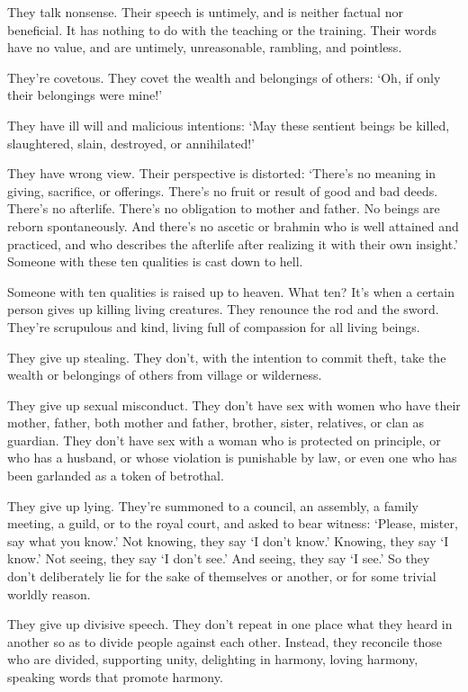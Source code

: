 \documentclass[12pt,openany]{book}%
\begin{document}
They talk nonsense. Their speech is untimely, and is neither factual nor beneficial. It has nothing to do with the teaching or the training. Their words have no value, and are untimely, unreasonable, rambling, and pointless. 

They’re covetous. They covet the wealth and belongings of others: ‘Oh, if only their belongings were mine!’ 

They have ill will and malicious intentions: ‘May these sentient beings be killed, slaughtered, slain, destroyed, or annihilated!’ 

They have wrong view. Their perspective is distorted: ‘There’s no meaning in giving, sacrifice, or offerings. There’s no fruit or result of good and bad deeds. There’s no afterlife. There’s no obligation to mother and father. No beings are reborn spontaneously. And there’s no ascetic or brahmin who is well attained and practiced, and who describes the afterlife after realizing it with their own insight.’ Someone with these ten qualities is cast down to hell. 

Someone with ten qualities is raised up to heaven. What ten? It’s when a certain person gives up killing living creatures. They renounce the rod and the sword. They’re scrupulous and kind, living full of compassion for all living beings. 

They give up stealing. They don’t, with the intention to commit theft, take the wealth or belongings of others from village or wilderness. 

They give up sexual misconduct. They don’t have sex with women who have their mother, father, both mother and father, brother, sister, relatives, or clan as guardian. They don’t have sex with a woman who is protected on principle, or who has a husband, or whose violation is punishable by law, or even one who has been garlanded as a token of betrothal. 

They give up lying. They’re summoned to a council, an assembly, a family meeting, a guild, or to the royal court, and asked to bear witness: ‘Please, mister, say what you know.’ Not knowing, they say ‘I don’t know.’ Knowing, they say ‘I know.’ Not seeing, they say ‘I don’t see.’ And seeing, they say ‘I see.’ So they don’t deliberately lie for the sake of themselves or another, or for some trivial worldly reason. 

They give up divisive speech. They don’t repeat in one place what they heard in another so as to divide people against each other. Instead, they reconcile those who are divided, supporting unity, delighting in harmony, loving harmony, speaking words that promote harmony. 
\end{document}
